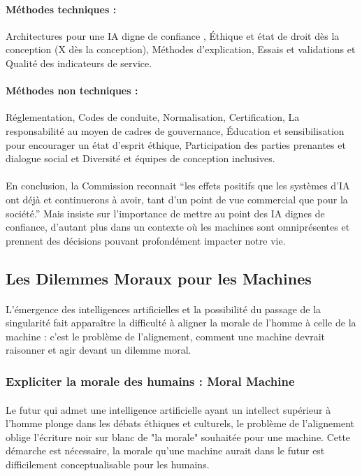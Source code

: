 \documentclass[10pt, french, a4paper]{report}
\begin{document}
\paragraph{Méthodes techniques :} Architectures pour une IA digne de confiance , Éthique et état de droit dès la conception (X dès la conception), Méthodes d’explication, Essais et validations et Qualité des indicateurs de service.

\paragraph{Méthodes non techniques :} Réglementation, Codes de conduite, Normalisation, Certification, La responsabilité au moyen de cadres de gouvernance, Éducation et sensibilisation pour encourager un état d’esprit éthique, Participation des parties prenantes et dialogue social et Diversité et équipes de conception inclusives.

\paragraph{}
En conclusion, la Commission reconnait ``les effets positifs que les systèmes d’IA ont déjà et continuerons à avoir, tant d’un point de vue commercial que pour la société.'' Mais insiste sur l'importance de mettre au point des IA dignes de confiance, d'autant plus dans un contexte où les machines sont omniprésentes et prennent des décisions pouvant profondément impacter notre vie.

\subsection{Les Dilemmes Moraux pour les Machines}

\paragraph{}
L’émergence des intelligences artificielles et la possibilité du passage de la singularité fait apparaître la difficulté à aligner la morale de l’homme à celle de la machine : c’est le problème de l’alignement, comment une machine devrait raisonner et agir devant un dilemme moral.

\subsubsection{Expliciter la morale des humains : Moral Machine}

\paragraph{}
Le futur qui admet une intelligence artificielle ayant un intellect supérieur à l’homme plonge dans les débats éthiques et culturels, le problème de l’alignement oblige l'écriture noir sur blanc de "la morale" souhaitée pour une machine. Cette démarche est nécessaire, la morale qu’une machine aurait dans le futur est difficilement conceptualisable pour les humains.
\end{document}
